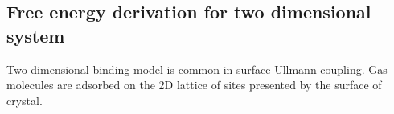 \subsection{Free energy derivation for two dimensional system}
Two-dimensional binding model is common in surface Ullmann coupling. Gas molecules are adsorbed on the 2D lattice of sites presented by the surface of crystal.